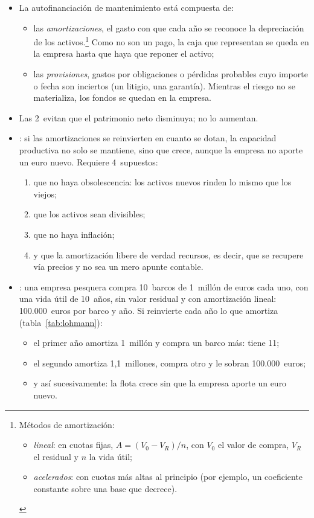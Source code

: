 \documentclass[11pt]{article}
\begin{document}
\begin{itemize}
\item La autofinanciación de mantenimiento está compuesta de:
  \begin{itemize}
  \item las \emph{amortizaciones}, el gasto con que cada año se reconoce la depreciación de los activos.\footnote{Métodos de amortización:
\begin{itemize}
\item \emph{lineal}: en cuotas fijas, $A=(V_0-V_R)/n$, con $V_0$ el valor de compra, $V_R$ el residual y $n$ la vida útil;
\item \emph{acelerados}: con cuotas más altas al principio (por ejemplo, un coeficiente constante sobre una base que decrece).
\end{itemize}} Como no son un pago, la caja que representan se queda en la empresa hasta que haya que reponer el activo;
  \item las \emph{provisiones}, gastos por obligaciones o pérdidas probables cuyo importe o fecha son inciertos (un litigio, una garantía). Mientras el riesgo no se materializa, los fondos se quedan en la empresa.
  \end{itemize}
\item Las 2~evitan que el patrimonio neto disminuya; no lo aumentan.
\item {}: si las amortizaciones se reinvierten en cuanto se dotan, la capacidad productiva no solo se mantiene, sino que crece, aunque la empresa no aporte un euro nuevo. Requiere 4~supuestos:
  \begin{enumerate}
  \item que no haya obsolescencia: los activos nuevos rinden lo mismo que los viejos;
  \item que los activos sean divisibles;
  \item que no haya inflación;
  \item y que la amortización libere de verdad recursos, es decir, que se recupere vía precios y no sea un mero apunte contable.
  \end{enumerate}
\item {}: una empresa pesquera compra 10~barcos de 1~millón de euros cada uno, con una vida útil de 10~años, sin valor residual y con amortización lineal: 100.000~euros por barco y año. Si reinvierte cada año lo que amortiza (tabla~\ref{tab:lohmann}):
  \begin{itemize}
  \item el primer año amortiza 1~millón y compra un barco más: tiene 11;
  \item el segundo amortiza 1,1~millones, compra otro y le sobran 100.000~euros;
  \item y así sucesivamente: la flota crece sin que la empresa aporte un euro nuevo.
  \end{itemize}
\end{itemize}
\end{document}
